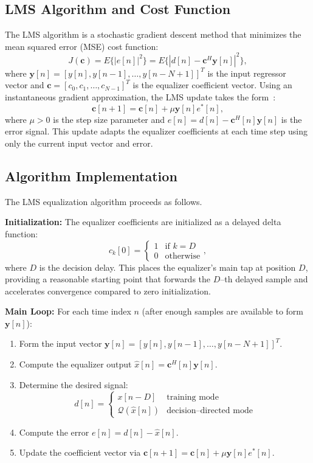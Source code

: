 \documentclass[12pt]{article}
\begin{document}
\subsection{LMS Algorithm and Cost Function}
The LMS algorithm is a stochastic gradient descent method that minimizes the mean squared error (MSE) cost function:
\begin{equation}
J(\mathbf{c}) = E\{|e[n]|^2\} = E\{|d[n] - \mathbf{c}^H\mathbf{y}[n]|^2\},
\end{equation}
where $\mathbf{y}[n] = [y[n], y[n-1], \ldots, y[n-N+1]]^T$ is the input regressor vector and $\mathbf{c} = [c_0, c_1, \ldots, c_{N-1}]^T$ is the equalizer coefficient vector. Using an instantaneous gradient approximation, the LMS update takes the form~\cite{haykin}:
\begin{equation}
\mathbf{c}[n+1] = \mathbf{c}[n] + \mu \mathbf{y}[n]e^*[n],
\end{equation}
where $\mu > 0$ is the step size parameter and $e[n] = d[n] - \mathbf{c}^H[n]\mathbf{y}[n]$ is the error signal. This update adapts the equalizer coefficients at each time step using only the current input vector and error.

\subsection{Algorithm Implementation}
The LMS equalization algorithm proceeds as follows.

\textbf{Initialization:} The equalizer coefficients are initialized as a delayed delta function:
\begin{equation}
c_k[0] = \begin{cases} 1 & \text{if } k = D \\ 0 & \text{otherwise} \end{cases},
\end{equation}
where $D$ is the decision delay. This places the equalizer's main tap at position $D$, providing a reasonable starting point that forwards the $D$--th delayed sample and accelerates convergence compared to zero initialization.

\textbf{Main Loop:} For each time index $n$ (after enough samples are available to form $\mathbf{y}[n]$):

\begin{enumerate}
\item Form the input vector $\mathbf{y}[n] = [y[n], y[n-1], \ldots, y[n-N+1]]^T$.
\item Compute the equalizer output $\hat{x}[n] = \mathbf{c}^H[n]\mathbf{y}[n]$.
\item Determine the desired signal:
\begin{equation}
d[n] = \begin{cases}
x[n-D] & \text{training mode} \\
\mathcal{Q}(\hat{x}[n]) & \text{decision--directed mode}
\end{cases}
\end{equation}
\item Compute the error $e[n] = d[n] - \hat{x}[n]$.
\item Update the coefficient vector via $\mathbf{c}[n+1] = \mathbf{c}[n] + \mu \mathbf{y}[n]e^*[n]$.
\end{enumerate}
\end{document}
